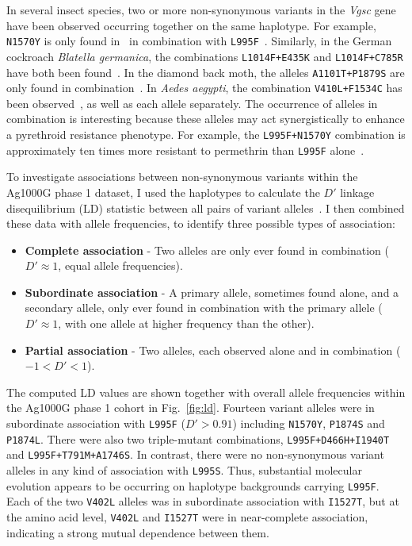 \documentclass[a4paper,11pt,abstracton,hidelinks]{scrartcl}
\begin{document}
In several insect species, two or more non-synonymous variants in the \textit{Vgsc} gene have been observed occurring together on the same haplotype.
%
For example, \texttt{N1570Y} is only found in \agam\ in combination with \texttt{L995F}~\parencite{Jones2012}.
%
Similarly, in the German cockroach \textit{Blatella germanica}, the combinations \texttt{L1014F+E435K} and \texttt{L1014F+C785R} have both been found~\parencite{Tan2002}.
%
In the diamond back moth, the alleles \texttt{A1101T+P1879S} are only found in combination~\parencite{Sonoda2010}.
%
In \textit{Aedes aegypti}, the combination \texttt{V410L+F1534C} has been observed~\parencite{Haddi2017}, as well as each allele separately.
%
The occurrence of alleles in combination is interesting because these alleles may act synergistically to enhance a pyrethroid resistance phenotype.
%
For example, the \texttt{L995F+N1570Y} combination is approximately ten times more resistant to permethrin than \texttt{L995F} alone~\parencite{Wang2015}.


To investigate associations between non-synonymous variants within the Ag1000G phase 1 dataset, I used the haplotypes to calculate the $D'$ linkage disequilibrium (LD) statistic between all pairs of variant alleles~\parencite{Lewontin1964}.
%
I then combined these data with allele frequencies, to identify three possible types of association:
%
\begin{itemize}
    \item \textbf{Complete association} - Two alleles are only ever found in combination ($D' \approx 1$, equal allele frequencies).
    \item \textbf{Subordinate association} - A primary allele, sometimes found alone, and a secondary allele, only ever found in combination with the primary allele ($D' \approx 1$, with one allele at higher frequency than the other).
    \item \textbf{Partial association} - Two alleles, each observed alone and in combination ($-1 < D' < 1$).
\end{itemize}


The computed LD values are shown together with overall allele frequencies within the Ag1000G phase 1 cohort in Fig.~\ref{fig:ld}.
%
Fourteen variant alleles were in subordinate association with \texttt{L995F} ($D' > 0.91$) including \texttt{N1570Y}, \texttt{P1874S} and \texttt{P1874L}.
%
There were also two triple-mutant combinations, \texttt{L995F+D466H+I1940T} and \texttt{L995F+T791M+A1746S}.
%
In contrast, there were no non-synonymous variant alleles in any kind of association with \texttt{L995S}.
%
Thus, substantial molecular evolution appears to be occurring on haplotype backgrounds carrying \texttt{L995F}.
%
Each of the two \texttt{V402L} alleles was in subordinate association with \texttt{I1527T}, but at the amino acid level, \texttt{V402L} and \texttt{I1527T} were in near-complete association, indicating a strong mutual dependence between them.
\end{document}
